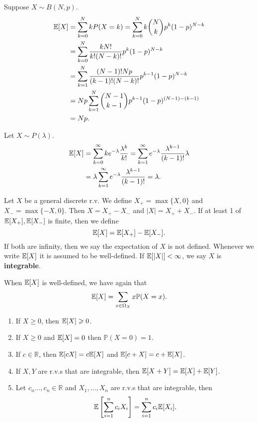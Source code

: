 \begin{example}
    Suppose $ X\sim B(N,p) $.
    \begin{align*}
        {\mathbb{E}}[X]&= \sum_{k=0}^{N} kP(X=k)=\sum_{k=0}^{N}k \binom{N}{k}p^k (1-p)^{N-k}\\ 
        &= \sum_{k=0}^{N}\frac{kN!}{k!(N-k)!}p^k (1-p)^{N-k}\\ 
        &= \sum_{k=1}^{N} \frac{(N-1)!Np}{(k-1)!(N-k)!}p^{k-1}(1-p)^{N-k}\\ 
        &= Np \sum_{k=1}^{N} \binom{N-1}{k-1}p^{k-1}(1-p)^{(N-1)-(k-1)}\\ 
        &= Np.
    \end{align*}
\end{example}

\begin{example}
    Let $ X\sim P(\lambda) $.
    \begin{align*}
        {\mathbb{E}}[X]&=\sum_{k=0}^{\infty} k e^{-\lambda} \frac{\lambda^k}{k!} = \sum_{k=1}^{\infty} e^{-\lambda}\frac{\lambda^{k-1}}{(k-1)!}\lambda\\
        &= \lambda \sum_{k=1}^{\infty} e^{-\lambda}\frac{\lambda^{k-1}}{(k-1)!} = \lambda.
    \end{align*}
\end{example}

\begin{definition}
    Let $X$ be a general discrete r.v. We define $ X_+=\max \{X,0\} $ and $ X_-=\max \{-X,0\} $. Then $X=X_+-X_-$ and $ |X|=X_++X_- $. If at least 1 of $ {\mathbb{E}}[X_+],{\mathbb{E}}[X_-] $ is finite, then we define 
    \[
        {\mathbb{E}}[X] = {\mathbb{E}}[X_+]-{\mathbb{E}}[X_-].
    \]
    If both are infinity, then we say the expectation of $X$ is not defined. Whenever we write $ {\mathbb{E}}[X] $ it is assumed to be well-defined. If $ {\mathbb{E}}[|X|]<\infty  $, we say $X$ is \textbf{integrable}.
\end{definition}
When $ {\mathbb{E}}[X] $ is well-defined, we have again that 
\[
    {\mathbb{E}}[X] = \sum_{x\in \Omega_X}x \mathbb{P}(X=x).
\]

\begin{proposition}\label{prop:properties of expectation}
    \begin{enumerate}
        \item If $ X\ge 0 $, then $ {\mathbb{E}}[X]\geqslant 0 $.
        \item If $X\ge 0 $ and $ {\mathbb{E}}[X]=0 $ then $ \mathbb{P}(X=0)=1$.
        \item If $ c\in \mathbb{R} $, then $ {\mathbb{E}}[cX]=c{\mathbb{E}}[X] $ and $ {\mathbb{E}}[c+X]=c+{\mathbb{E}}[X] $.
        \item If $ X,Y $ are r.v.s that are integrable, then $ {\mathbb{E}}[X+Y]={\mathbb{E}}[X]+{\mathbb{E}}[Y] $.
        \item Let $ c_n\dots,c_n\in \mathbb{R}  $ and $ X_1,\dots,X_n $ are r.v.s that are integrable, then 
        \[
            {\mathbb{E}}\left[ \sum_{i=1}^{n}c_iX_i \right] = \sum_{i=1}^{n} c_i{\mathbb{E}}[X_i].
        \]
    \end{enumerate}
\end{proposition}

